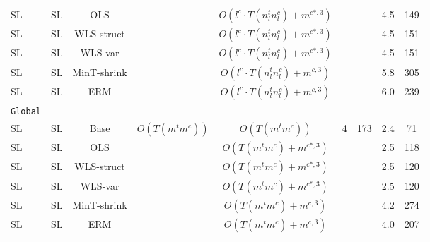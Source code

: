 \documentclass[preprint, 3p, times, twocolumn]{elsarticle}
\begin{document}
\begin{table}[t]
\begin{center}
{\begin{tabular}{l c ccccccc}
    \hspace{0.1cm} SL &SL &OLS &  &$O(l^c \cdot T(n^t_l n_l^c) + m^{c*,3})$  	&		&	&4.5	&149	\\
    \hspace{0.1cm} SL &SL &WLS-struct &  &$O(l^c \cdot T(n^t_ln_l^c) + m^{c*,3})$ &			&	&4.5	&151	\\
    \hspace{0.1cm} SL &SL &WLS-var &  &$O(l^c \cdot T(n^t_ln_l^c) + m^{c*,3})$		&	&	&4.5	&151	\\
    \hspace{0.1cm} SL &SL &MinT-shrink & &$O(l^c \cdot T(n^t_ln_l^c) + m^{c,3})$ &			&	&5.8	&305	\\
    \hspace{0.1cm} SL &SL &ERM &  &$O(l^c \cdot T(n^t_ln_l^c) + m^{c,3})$		&	&	&6.0	&239	\\
    \midrule 						
    \texttt{Global}  						\\
    \hspace{0.1cm} SL &SL &Base & \multirow{6}{*}{$O(T(m^tm^c))$} &$O(T(m^tm^c))$ 		&\multirow{6}{*}{4}	&\multirow{6}{*}{173}	&2.4	&71	\\
    \hspace{0.1cm} SL &SL &OLS &  &$O(T(m^tm^c) + m^{c*,3})$  		&	&	&2.5	&118	\\
    \hspace{0.1cm} SL &SL &WLS-struct &  &$O(T(m^tm^c) + m^{c*,3})$ 		&	&	&2.5	&120	\\
    \hspace{0.1cm} SL &SL &WLS-var &  &$O(T(m^tm^c) + m^{c*,3})$ 		&	&	&2.5	&120	\\
    \hspace{0.1cm} SL &SL &MinT-shrink &  &$O(T(m^tm^c) + m^{c,3})$		&	&	&4.2	&274	\\
    \hspace{0.1cm} SL &SL &ERM &  &$O(T(m^tm^c) + m^{c,3})$		&	&	&4.0	&207	\\
    \bottomrule				        
    \end{tabular}}
    \end{center}
    \end{table}
  
\end{document}
